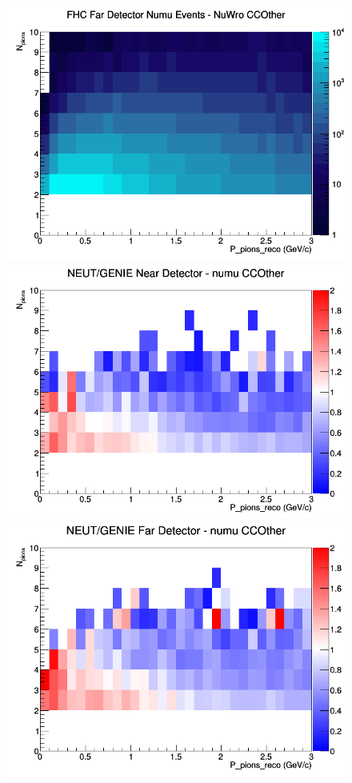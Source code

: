 \documentclass[12pt]{article}
\begin{document}
\begin{figure}[h]
\endminipage
{}
\includegraphics[width=\linewidth]{eff_N_P/GAr/pions/CCOther_FHC_FD_numu_N_P_NuWro.png}
\endminipage
\newline
{}
\includegraphics[width=\linewidth]{eff_N_P/GAr/pions/ratios/CCOther_NEUT_GENIE_numu_near_N_P.png}
\endminipage
{}
\includegraphics[width=\linewidth]{eff_N_P/GAr/pions/ratios/CCOther_NEUT_GENIE_numu_far_N_P.png}

\end{figure}
\end{document}
